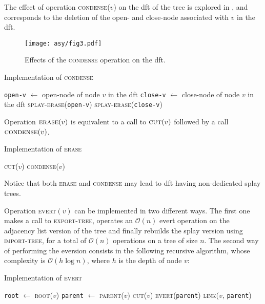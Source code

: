 \documentclass[a4paper,USenglish]{lipics}
\newcommand{\var}[1]{\textrm{\texttt{#1}}}
\newcommand{\bigoh}{\mathcal{O}}
\begin{document}
		The effect of operation \textsc{condense}($v$) on the dft of the tree is explored in , and corresponds to the deletion of the open- and close-node associated with $v$ in the dft.
\begin{figure}[t]\centering 
	\texttt{[image: asy/fig3.pdf]}
			\caption{Effects of the \textsc{condense} operation on the dft.\label{fig:condense}}
		\end{figure}
		\begin{algorithm}[H]
		  \small
		  \caption{\small Implementation of \textsc{condense}}
		  \begin{algorithmic}[1]
			\State \var{open-v} $\gets$ open-node of node $v$ in the dft
			\State \var{close-v} $\gets$ close-node of node $v$ in the dft
			\State \textsc{splay-erase}(\var{open-v})
			\State \textsc{splay-erase}(\var{close-v})
		    \EndProcedure
		  \end{algorithmic}
		\end{algorithm}

		Operation $\textsc{erase}(v)$ is equivalent to a call to $\textsc{cut}(v)$ followed by a call $\textsc{condense}(v)$.
		\begin{algorithm}[H]
		  \small
		  \caption{\small Implementation of \textsc{erase}}
		  \begin{algorithmic}[1]
			\State \textsc{cut}($v$)
			\State \textsc{condense}($v$)
		    \EndProcedure
		  \end{algorithmic}
		\end{algorithm}		 
		
Notice that both \textsc{erase} and \textsc{condense} may lead to dft having non-dedicated splay trees.
		
		Operation \textsc{evert}$(v)$ can be implemented in two different ways. The first one makes a call to \textsc{export-tree}, operates an $\bigoh(n)$ evert operation on the adjacency list version of the tree and finally rebuilds the splay version using \textsc{import-tree}, for a total of $\bigoh(n)$ operations on a tree of size $n$. The second way of performing the eversion consists in the following recursive algorithm, whose complexity is $\bigoh(h \log n)$, where $h$ is the depth of node $v$:
		\begin{algorithm}[H]
		  \small
		  \caption{\small Implementation of \textsc{evert}}
		  \begin{algorithmic}[1]
		    \State \var{root} $\gets$ \textsc{root}($v$)
			\If{$v \neq \var{root}$}
				\State \var{parent} $\gets$ \textsc{parent}($v$)
				\State \textsc{cut}($v$)
				\State \textsc{evert}(\var{parent})
				\State \textsc{link}($v$, \var{parent})
			\EndIf
		    \EndProcedure
		  \end{algorithmic}
		\end{algorithm}		
		
\end{document}
